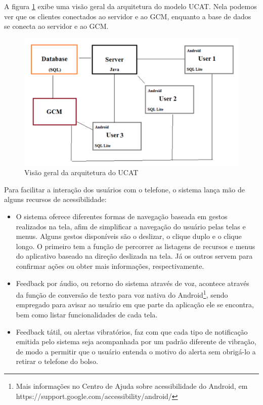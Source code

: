 \documentclass[english,brazilian]{UNISINOSmonografia}
\begin{document}
A figura \ref{fig:visaoGeralUCAT} exibe uma visão geral da arquitetura do modelo UCAT. Nela podemos ver que os clientes conectados ao servidor e ao GCM, enquanto a base de dados se conecta ao servidor e ao GCM. 

\begin{figure}
	\caption{Visão geral da arquitetura do UCAT}
	\label{fig:visaoGeralUCAT}
	\centering%
	\begin{minipage}{.6\textwidth}
		\includegraphics[width=\textwidth]{imgs/ucatArquitetura}
		\end{minipage}
\end{figure}

Para facilitar a interação dos usuários com o telefone, o sistema lança mão de alguns recursos de acessibilidade:
\begin{itemize}
	\item O sistema oferece diferentes formas de navegação baseada em gestos realizados na tela, afim de simplificar a navegação do usuário pelas telas e menus. Alguns gestos disponíveis são o deslizar, o clique duplo e o clique longo. O primeiro tem a função de percorrer as listagens de recursos e menus do aplicativo baseado na direção deslizada na tela. Já os outros servem para confirmar ações ou obter mais informações, respectivamente.
	
	\item Feedback por áudio, ou retorno do sistema através de voz, acontece através da função de conversão de texto para voz nativa do Android\footnote{Mais informações no Centro de Ajuda sobre acessibilidade do Android, em https://support.google.com/accessibility/android/}, sendo empregado para avisar ao usuário em que parte da aplicação ele se encontra, bem como listar funcionalidades de cada tela.

	\item Feedback tátil, ou alertas vibratórios, faz com que cada tipo de notificação emitida pelo sistema seja acompanhada por um padrão diferente de vibração, de modo a permitir que o usuário entenda o motivo do alerta sem obrigá-lo a retirar o telefone do bolso.
\end{itemize}
\end{document}
